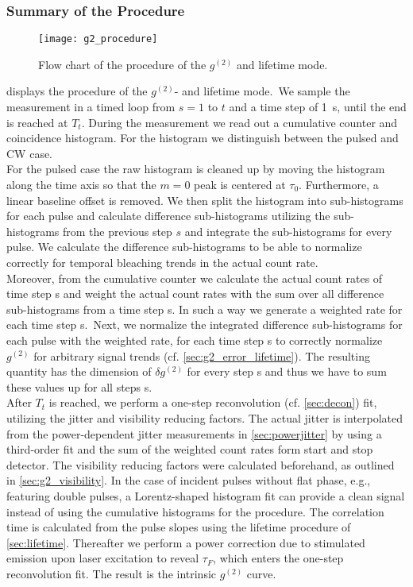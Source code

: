 \subsubsection{Summary of the Procedure}\label{sec:summarydeconv}
\begin{figure}[h!]
	\centering
	\texttt{[image: g2\_procedure]}
	\caption{Flow chart of the procedure of the $g^{(2)}$ and lifetime mode.}
	\label{fig:g2_procedure}
\end{figure}
\noindent {} displays the procedure of the $g^{(2)}$- and lifetime mode.~We sample the measurement in a timed loop from $s=1$ to $t$ and a time step of \SI{1}{\s}, until the end is reached at $T_t$. During the measurement we read out a cumulative counter and coincidence histogram. For the histogram we distinguish between the pulsed and \ac{CW} case.\\
For the pulsed case the raw histogram is cleaned up by moving the histogram along the time axis so that the $m=0$ peak is centered at $\tau_0$. Furthermore, a linear baseline offset is removed. We then split the histogram into sub-histograms for each pulse and calculate difference sub-histograms utilizing the sub-histograms from the previous step $s$ and integrate the sub-histograms for every pulse. We calculate the difference sub-histograms to be able to normalize correctly for temporal bleaching trends in the actual count rate.\\
Moreover, from the cumulative counter we calculate the actual count rates of time step s and weight the actual count rates with the sum over all difference sub-histograms from a time step s. In such a way we generate a weighted rate for each time step s.~Next, we normalize the integrated difference sub-histograms for each pulse with the weighted rate, for each time step s to correctly normalize $g^{(2)}$ for arbitrary signal trends (cf. \cref{sec:g2_error_lifetime}). The resulting quantity has the dimension of $\delta g^{(2)}$ for every step s and thus we have to sum these values up for all steps s.\\
After $T_t$ is reached, we perform a one-step reconvolution (cf. \cref{sec:decon}) fit, utilizing the jitter and visibility reducing factors. The actual jitter is interpolated from the power-dependent jitter measurements in \cref{sec:powerjitter} by using a third-order fit and the sum of the weighted count rates form start and stop detector. The visibility reducing factors were calculated beforehand, as outlined in \cref{sec:g2_visibility}.
In the case of incident pulses without flat phase, e.g., featuring double pulses, a Lorentz-shaped histogram fit can provide a clean signal instead of using the cumulative histograms for the procedure. The correlation time is calculated from the pulse slopes using the lifetime procedure of \cref{sec:lifetime}. Thereafter we perform a power correction due to stimulated emission upon laser excitation \cite{beveratos_room_2002,treussart_photon_2001} to reveal $\tau_F$, which enters the one-step reconvolution fit. The result is the intrinsic $g^{(2)}$ curve.\\
